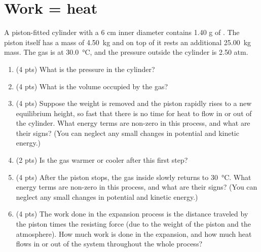 \documentclass[11pt]{article}
\begin{document}
\section{Work = heat}
\label{sec-3}
A piston-fitted cylinder with a 6 cm inner diameter contains 1.40 g of .  The piston itself has a mass of \SI{4.50}{\kilo\gram} and on top of it rests an additional \SI{25.00}{\kilo\gram} mass.  The gas is at \SI{30.0}{\celsius}, and the pressure outside the cylinder is 2.50 atm.

\begin{enumerate}
\item (4 pts) What is the pressure in the cylinder?
\item (4 pts) What is the volume occupied by the gas?
\item (4 pts) Suppose the weight is removed and the piston rapidly rises to a new equilibrium height, so fast that there is no time for heat to flow in or out of the cylinder. What energy terms are non-zero in this process, and what are their signs?  (You can neglect any small changes in potential and kinetic energy.)
\item (2 pts) Is the gas warmer or cooler after this first step?
\item (4 pts) After the piston stops, the gas inside slowly returns to \SI{30}{\celsius}.  What energy terms are non-zero in this process, and what are their signs?  (You can neglect any small changes in potential and kinetic energy.)
\item (4 pts) The work done in the expansion process is the distance traveled by the piston times the resisting force (due to the weight of the piston and the atmosphere).  How much work is done in the expansion, and how much heat flows in or out of the system throughout the whole process?
\end{enumerate}
\end{document}
